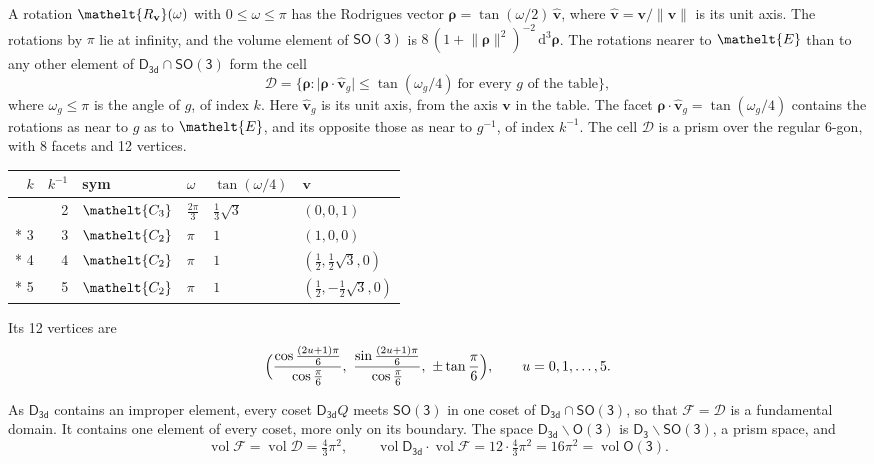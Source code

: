 \documentclass[10pt,a4paper]{article}
\numberwithin{equation}{section}
\newcommand{\eltfont}[1]{{\let\sigma\eltsigma\mathelt{#1}}}
\newcommand{\grp}[1]{\mathsf{#1}}
\newcommand{\cls}[1]{\eltfont{#1}}
\newcommand{\elt}[1]{\eltfont{#1}}
\newcommand{\dirvec}[3]{(#1, #2, #3)}
\newcommand{\unitaxis}{\hat{\mathbf{v}}}
\newcommand{\vv}{\mathbf{v}}
\newcommand{\diff}{\mathrm{d}}
\newcommand{\vol}{\operatorname{vol}}
\newcommand{\rodrigues}{\boldsymbol{\rho}}
\newcommand{\fcell}{\mathcal{D}}
\newcommand{\fdomain}{\mathcal{F}}
\begin{document}
\leavevmode\label{n:vector.rodrigues}\label{n:vector.unitaxis}A rotation $\elt{R_{\vv}}(\omega)$ with $0 \le \omega \le \pi$ has the Rodrigues vector $\rodrigues = \tan(\omega/2)\,\unitaxis$, where $\unitaxis = \vv/\lVert\vv\rVert$ is its unit axis. The rotations by $\pi$ lie at infinity, and the volume element of \href{SO3.pdf}{$\grp{SO(3)}$} is $8\,(1 + \lVert\rodrigues\rVert^2)^{-2}\,\diff^3\rodrigues$.
\leavevmode\label{n:set.cell}The rotations nearer to $\elt{E}$ than to any other element of $\grp{D_{3d}} \cap \grp{SO(3)}$ form the cell
\begin{equation}\label{e:cell}\fcell = \bigl\{\rodrigues : \lvert\rodrigues\cdot\unitaxis_g\rvert \le \tan(\omega_g/4)\ \text{for every $g$ of the table}\bigr\},\end{equation}
where $\omega_g \le \pi$ is the angle of $g$, of index $k$. Here $\unitaxis_g$ is its unit axis, from the axis $\vv$ in the table. The facet $\rodrigues\cdot\unitaxis_g = \tan(\omega_g/4)$ contains the rotations as near to $g$ as to $\elt{E}$, and its opposite those as near to $g^{-1}$, of index $k^{-1}$. The cell $\fcell$ is a prism over the regular 6-gon, with 8 facets and 12 vertices.
{\small{\renewcommand{\arraystretch}{1.3}\begin{longtable}{@{}rrllll@{}}\toprule
$k$ & $k^{-1}$ & sym & $\omega$ & $\tan(\omega/4)$ & $\vv$\\\midrule\endhead
\bottomrule\endfoot\endlastfoot
1 & 2 & $\cls{C_{3}}$ & $\tfrac{2\pi}{3}$ & $\tfrac{1}{3}\sqrt{3}$ & $\dirvec{0}{0}{1}$\\*
3 & 3 & $\cls{C_{2}}$ & $\pi$ & $1$ & $\dirvec{1}{0}{0}$\\*
4 & 4 & $\cls{C_{2}}$ & $\pi$ & $1$ & $\dirvec{\tfrac{1}{2}}{\tfrac{1}{2}\sqrt{3}}{0}$\\*
5 & 5 & $\cls{C_{2}}$ & $\pi$ & $1$ & $\dirvec{\tfrac{1}{2}}{-\tfrac{1}{2}\sqrt{3}}{0}$\\
\bottomrule\end{longtable}}}
\leavevmode\label{n:local.vertex.u}Its 12 vertices are
\begin{equation}\label{e:prism}\Bigl(\frac{\cos\frac{(2u+1)\pi}{6}}{\cos\frac{\pi}{6}},\ \frac{\sin\frac{(2u+1)\pi}{6}}{\cos\frac{\pi}{6}},\ \pm\tan\frac{\pi}{6}\Bigr),\qquad u = 0, 1, \dots, 5.\end{equation}

\leavevmode\label{n:set.fundamental}As $\grp{D_{3d}}$ contains an improper element, every coset $\grp{D_{3d}}Q$ meets \href{SO3.pdf}{$\grp{SO(3)}$} in one coset of $\grp{D_{3d}} \cap \grp{SO(3)}$, so that $\fdomain = \fcell$ is a fundamental domain. It contains one element of every coset, more only on its boundary.
The space $\grp{D_{3d}}\backslash\grp{O(3)}$ is $\grp{D_{3}}\backslash\grp{SO(3)}$, a prism space, and
\begin{equation}\label{e:volume}\vol\fdomain = \vol\fcell = \tfrac{4}{3}\pi^2,\qquad \vol\grp{D_{3d}}\cdot\vol\fdomain = 12\cdot \tfrac{4}{3}\pi^2 = 16\pi^2 = \vol\grp{O(3)}.\end{equation}
\end{document}
